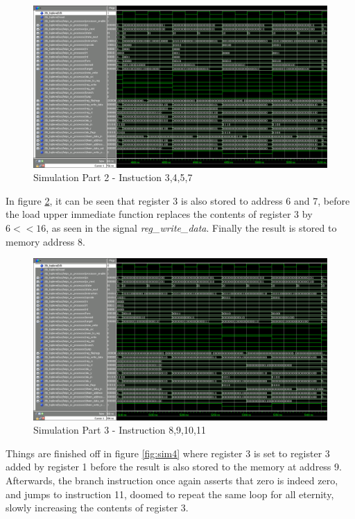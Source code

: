 \begin{figure}[ht]
    \centering
    \includegraphics[scale=0.36]{figures/sim2.png}
    \caption{\label{fig:sim2}Simulation Part 2 - Instuction 3,4,5,7}
\end{figure}

In figure \ref{fig:sim3}, it can be seen that register 3 is also stored to address 6 and 7, before the load upper immediate function replaces the contents of register 3 by $6 << 16$, as seen in the signal \emph{reg_write_data}. Finally the result is stored to memory address 8.

\begin{figure}[ht]
    \centering
    \includegraphics[scale=0.36]{figures/sim3.png}
    \caption{\label{fig:sim3}Simulation Part 3 - Instruction 8,9,10,11}
\end{figure}

Things are finished off in figure \ref{fig:sim4} where register 3 is set to register 3 added by register 1 before the result is also stored to the memory at address 9. Afterwards, the branch instruction once again asserts that zero is indeed zero, and jumps to instruction 11, doomed to repeat the same loop for all eternity, slowly increasing the contents of register 3.

